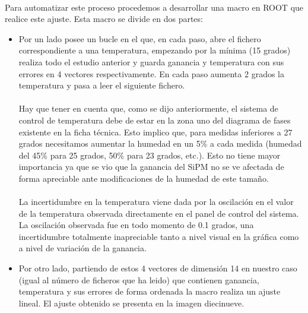 \documentclass[11pt, a4paper]{article}
\begin{document}
\paragraph {}
Para automatizar este proceso procedemos a desarrollar una macro en ROOT que realice este ajuste. Esta macro se divide en dos partes:
\begin{itemize}
\item{} Por un lado posee un bucle en el que, en cada paso, abre el fichero correspondiente a una temperatura, empezando por la mínima (15 grados) realiza todo el estudio anterior y guarda ganancia y temperatura con sus errores en 4 vectores respectivamente. En cada paso aumenta 2 grados la temperatura y pasa a leer el siguiente fichero.

\paragraph {}
Hay que tener en cuenta que, como se dijo anteriormente, el sistema de control de temperatura debe de estar en la zona uno del diagrama de fases existente en la ficha técnica. Esto implico que, para medidas inferiores a 27 grados necesitamos aumentar la humedad en un 5\% a cada medida (humedad del 45\% para 25 grados, 50\% para 23 grados, etc.). Esto no tiene mayor importancia ya que se vio que la ganancia del SiPM no se ve afectada de forma apreciable ante modificaciones de la humedad de este tamaño.

\paragraph {}
La incertidumbre en la temperatura viene dada por la oscilación en el valor de la temperatura observada directamente en el panel de control del sistema. La oscilación observada fue en todo momento de 0.1 grados, una incertidumbre totalmente inapreciable tanto a nivel visual en la gráfica como a nivel de variación de la ganancia.

\item {} Por otro lado, partiendo de estos 4 vectores de dimensión 14 en nuestro caso (igual al número de ficheros que ha leido) que contienen ganancia, temperatura y sus errores de forma ordenada la macro realiza un ajuste lineal. El ajuste obtenido se presenta en la imagen diecinueve.


\end{itemize}
\end{document}
